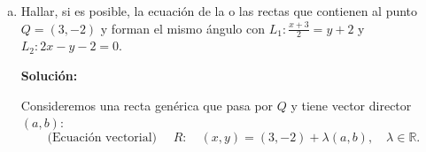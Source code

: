 \documentclass[11pt]{article}
\begin{document}
\begin{enumerate}[\hspace{-5mm} 1) ]
\begin{enumerate}[(a)]

\item  Hallar, si es posible, la ecuación de la o las rectas que contienen al punto $Q = (3,-2)$ y forman el mismo ángulo con $L_1 : \frac{x + 3}{2} = y + 2$ y $L_2 : 2x - y - 2 = 0$.
























\textbf{Solución:}

Consideremos una recta genérica que pasa por $Q$ y tiene vector director $(a, b)$:
\[ \text{(Ecuación vectorial) } \quad R :\quad  (x, y) = (3, -2) + \lambda (a, b), \quad \lambda \in \mathbb{R}. \]


\end{enumerate}
\end{enumerate}
\end{document}

